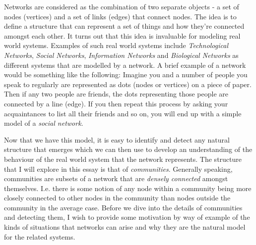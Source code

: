 Networks are considered as the combination of two separate objects - a set of nodes (vertices) and a set of links (edges) that connect nodes. The idea is to define a structure that can represent a set of things and how they're connected amongst each other. It turns out that this idea is invaluable for modeling real world systems. Examples of such real world systems include \emph{Technological Networks}, \emph{Social Networks}, \emph{Information Networks} and \emph{Biological Networks} as different systems that are modelled by a network.\cite[Contents]{newman10} A brief example of a network would be something like the following: Imagine you and a number of people you speak to regularly are represented as dots (nodes or vertices) on a piece of paper. Then if any two people are friends, the dots representing those people are connected by a line (edge). If you then repeat this process by asking your acquaintances to list all their friends and so on, you will end up with a simple model of a \emph{social network}.

Now that we have this model, it is easy to identify and detect any natural structure that emerges which we can then use to develop an understanding of the behaviour of the real world system that the network represents. The structure that I will explore in this essay is that of \emph{communities}. Generally speaking, communities are subsets of a network that are \emph{densely connected} amongst themselves\label{copy:community_intuition}. I.e. there is some notion of any node within a community being more closely connected to other nodes in the community than nodes outside the community in the average case. Before we dive into the details of communities and detecting them, I wish to provide some motivation by way of example of the kinds of situations that networks can arise and why they are the natural model for the related systems.

